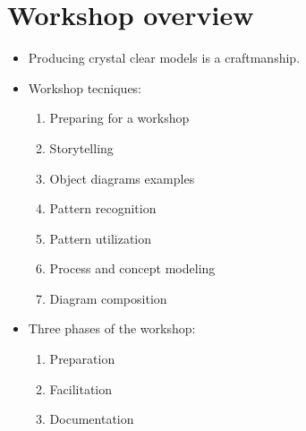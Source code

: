 \section{Workshop overview}
\begin{itemize}
    \item Producing crystal clear models is a craftmanship. 
    \item Workshop tecniques:
        \begin{enumerate}
            \item Preparing for a workshop 
            \item Storytelling 
            \item Object diagrams examples 
            \item Pattern recognition 
            \item Pattern utilization 
            \item Process and concept modeling 
            \item Diagram composition 
        \end{enumerate}
    
    \item Three phases of the workshop:
        \begin{enumerate}
            \item Preparation 
            \item Facilitation 
            \item Documentation 
        \end{enumerate}
\end{itemize}


